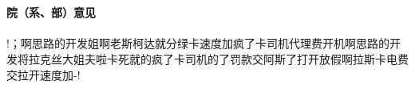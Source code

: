 \documentclass{template}
\begin{document}
\begin{center}
\begin{longtabu}
\\
 \\
\hline
\textbf{院（系、部）意见}\\\hline
\\
!；啊思路的开发姐啊老斯柯达就分绿卡速度加疯了卡司机代理费开机啊思路的开发将拉克丝大姐夫啦卡死就的疯了卡司机的了罚款交阿斯了打开放假啊拉斯卡电费交拉开速度加-!\\
\\
 \\
\hline
\end{longtabu}
\end{center}
\end{document}

